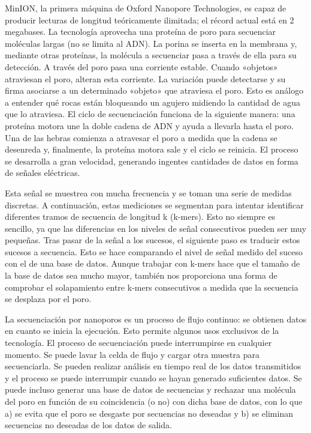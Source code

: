 MinION, la primera máquina de Oxford Nanopore Technologies, es capaz de producir lecturas de longitud teóricamente ilimitada; el récord actual está en 2 megabases. La tecnología aprovecha una proteína de poro para secuenciar moléculas largas (no se limita al ADN). La porina se inserta en la membrana y, mediante otras proteínas, la molécula a secuenciar pasa a través de ella para su detección. A través del poro pasa una corriente estable. Cuando «objetos» atraviesan el poro, alteran esta corriente. La variación puede detectarse y su firma asociarse a un determinado «objeto» que atraviesa el poro.
Esto es análogo a entender qué rocas están bloqueando un agujero midiendo la cantidad de agua que lo atraviesa.
El ciclo de secuenciación funciona de la siguiente manera: una proteína motora une la doble cadena de ADN y ayuda a llevarla hasta el poro. Una de las hebras comienza a atravesar el poro a medida que la cadena se desenreda y, finalmente, la proteína motora sale y el ciclo se reinicia.
El proceso se desarrolla a gran velocidad, generando ingentes cantidades de datos en forma de señales eléctricas.

Esta señal se muestrea con mucha frecuencia y se toman una serie de medidas discretas. A continuación, estas mediciones se segmentan para intentar identificar diferentes tramos de secuencia de longitud k (k-mers). Esto no siempre es sencillo, ya que las diferencias en los niveles de señal consecutivos pueden ser muy pequeñas.
Tras pasar de la señal a los sucesos, el siguiente paso es traducir estos sucesos a secuencia. Esto se hace comparando el nivel de señal medido del suceso con el de una base de datos.
Aunque trabajar con k-mers hace que el tamaño de la base de datos sea mucho mayor, también nos proporciona una forma de comprobar el solapamiento entre k-mers consecutivos a medida que la secuencia se desplaza por el poro.

La secuenciación por nanoporos es un proceso de flujo continuo: se obtienen datos en cuanto se inicia la ejecución. Esto permite algunos usos exclusivos de la tecnología.
El proceso de secuenciación puede interrumpirse en cualquier momento. Se puede lavar la celda de flujo y cargar otra muestra para secuenciarla.
Se pueden realizar análisis en tiempo real de los datos transmitidos y el proceso se puede interrumpir cuando se hayan generado suficientes datos.
Se puede incluso generar una base de datos de secuencias y rechazar una molécula del poro en función de su coincidencia (o no) con dicha base de datos, con lo que a) se evita que el poro se desgaste por secuencias no deseadas y b) se eliminan secuencias no deseadas de los datos de salida.

